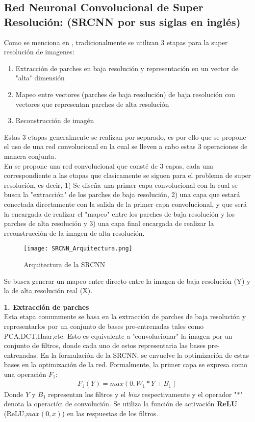 \subsection{Red Neuronal Convolucional de Super Resolución: (SRCNN por sus siglas en inglés)}
Como se menciona en \cite{freeman}, tradicionalmente se utilizan 3 etapas para la super resolución de imagenes:
\begin{enumerate}
    \item Extracción de parches en baja resolución y representación en un vector de "alta" dimensión
    \item Mapeo entre vectores (parches de baja resolución) de baja resolución con vectores que representan parches de alta
    resolución
    \item Reconstrucción de imagén
\end{enumerate}
Estas 3 etapas generalmente se realizan por separado, es por ello que se propone el uso de una red convolucional en la cual se
lleven a cabo estas 3 operaciones de manera conjunta.\\
En \cite{SRCNN} se propone una red convolucional que consté de 3 capas, cada una correspondiente a las etapas que clasicamente
se siguen para el problema de super resolución, es decir, 1) Se diseña una primer capa convolucional con la cual se busca la
"extracción" de los parches de baja resolución, 2) una capa que estará conectada directamente con la salida de la primer capa
convolucional, y que será la encargada de realizar el "mapeo" entre los parches de baja resolución y los parches de alta
resolución y 3) una capa final encargada de realizar la reconstrucción de la imagen de alta resolución.

\begin{figure}[H]
    \label{fig:SRCNN_Arquitectura}
    \centering
    \texttt{[image: SRCNN\_Arquitectura.png]}
    \caption{Arquitectura de la SRCNN}
\end{figure}

Se busca generar un mapeo entre directo entre la imagen de baja resolución (Y) y la de alta resolución real (X).

\textbf{1. Extracción de parches}\\
Esta etapa comunmente se basa en la extracción de parches de baja resolución y representarlos por un conjunto de bases pre-entrenadas
tales como PCA,DCT,Haar,etc. Esto es equivalente a "convolucionar" la imagen por un conjunto de filtros, donde cada uno de estos
representaria las bases pre-entrenadas. En la formulación de la SRCNN, se envuelve la optimización de estas bases en la optimización
de la red. Formalmente, la primer capa se expresa como una operación $F_1$:
\begin{align}
    \label{eqn:SRCNN_FirstLayer}
    F_1(Y)=max(0,W_1*Y+B_1)
\end{align}
Donde $Y$ y $B_1$ representan los filtros y el \emph{bias} respectivamente y el operador "$*$" denota la operación de convolución.
Se utiliza la función de activación \textbf{ReLU} (ReLU,$max(0,x)$) en las respuestas de los filtros.\\

